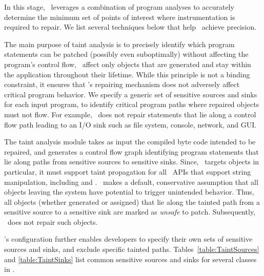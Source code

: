 In this stage, \tool\ leverages a combination of program analyses to accurately
determine the minimum set of points of interest where instrumentation is
required to repair. We list several techniques below that help \tool\ achieve
precision.

 The main purpose of taint analysis is to
precisely identify which program statements can be patched (possibly even
suboptimally) without affecting the program's control flow, \ie\ affect only
objects that are generated and stay within the application throughout their
lifetime. While this principle is not a binding constraint, it ensures that
\tool's repairing mechanism does not adversely affect critical program behavior.
We specify a generic set of sensitive sources and sinks for each input program,
to identify critical program paths where repaired  objects
must not flow. For example, \tool\ does not repair
 statements that lie along a control flow path leading to an I/O sink such as file
 system, console, network, and GUI.

The taint analysis module takes as input the compiled byte code intended to be
repaired, and generates a control flow graph identifying program statements that
lie along paths from sensitive sources to sensitive sinks. Since, \tool\ targets
 objects in particular, it must support taint propagation for all
\java\ APIs that support string manipulation, including  and
.
\tool\ makes a default, conservative assumption that all objects
leaving the system have potential to trigger unintended behavior. Thus, all
 objects (whether generated or assigned)
that lie along the tainted path from a sensitive source to a sensitive sink are
marked as \textit{unsafe} to patch. Subsequently, \tool\ does not repair such
 objects.

\tool's configuration further enables developers to specify their own sets of
sensitive sources and sinks, and exclude specific tainted paths.
Tables~\ref{table:TaintSources} and \ref{table:TaintSinks} list common
sensitive sources and sinks for several classes in \java.


